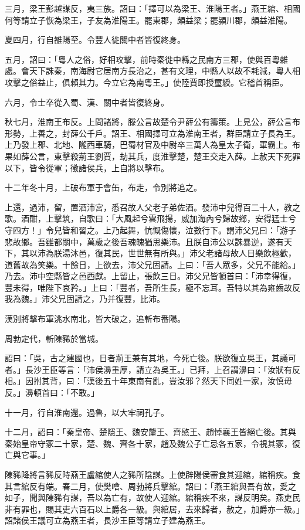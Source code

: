 \begin{pinyinscope}
三月，梁王彭越謀反，夷三族。詔曰：「擇可以為梁王、淮陽王者。」燕王綰、相國何等請立子恢為梁王，子友為淮陽王。罷東郡，頗益梁；罷潁川郡，頗益淮陽。

夏四月，行自雒陽至。令豐人徙關中者皆復終身。

五月，詔曰：「粵人之俗，好相攻擊，前時秦徙中縣之民南方三郡，使與百粵雜處。會天下誅秦，南海尉它居南方長治之，甚有文理，中縣人以故不耗減，粵人相攻擊之俗益止，俱賴其力。今立它為南粵王。」使陸賈即授璽綬。它稽首稱臣。

六月，令士卒從入蜀、漢、關中者皆復終身。

秋七月，淮南王布反。上問諸將，滕公言故楚令尹薛公有籌策。上見公，薛公言布形勢，上善之，封薛公千戶。詔王、相國擇可立為淮南王者，群臣請立子長為王。上乃發上郡、北地、隴西車騎，巴蜀材官及中尉卒三萬人為皇太子衛，軍霸上。布果如薛公言，東擊殺荊王劉賈，劫其兵，度淮擊楚，楚王交走入薛。上赦天下死罪以下，皆令從軍；徵諸侯兵，上自將以擊布。

十二年冬十月，上破布軍于會缶，布走，令別將追之。

上還，過沛，留，置酒沛宮，悉召故人父老子弟佐酒。發沛中兒得百二十人，教之歌。酒酣，上擊筑，自歌曰：「大風起兮雲飛揚，威加海內兮歸故鄉，安得猛士兮守四方！」令兒皆和習之。上乃起舞，忼慨傷懷，泣數行下。謂沛父兄曰：「游子悲故鄉。吾雖都關中，萬歲之後吾魂魄猶思樂沛。且朕自沛公以誅暴逆，遂有天下，其以沛為朕湯沐邑，復其民，世世無有所與。」沛父老諸母故人日樂飲極歡，道舊故為笑樂。十餘日，上欲去，沛父兄固請。上曰：「吾人眾多，父兄不能給。」乃去。沛中空縣皆之邑西獻。上留止，張飲三日。沛父兄皆頓首曰：「沛幸得復，豐未得，唯陛下哀矜。」上曰：「豐者，吾所生長，極不忘耳。吾特以其為雍齒故反我為魏。」沛父兄固請之，乃并復豐，比沛。

漢別將擊布軍洮水南北，皆大破之，追斬布番陽。

周勃定代，斬陳豨於當城。

詔曰：「吳，古之建國也，日者荊王兼有其地，今死亡後。朕欲復立吳王，其議可者。」長沙王臣等言：「沛侯濞重厚，請立為吳王。」已拜，上召謂濞曰：「汝狀有反相。」因拊其背，曰：「漢後五十年東南有亂，豈汝邪？然天下同姓一家，汝慎毋反。」濞頓首曰：「不敢。」

十一月，行自淮南還。過魯，以大牢祠孔子。

十二月，詔曰：「秦皇帝、楚隱王、魏安釐王、齊愍王、趙悼襄王皆絕亡後。其與秦始皇帝守冢二十家，楚、魏、齊各十家，趙及魏公子亡忌各五家，令視其冢，復亡與它事。」

陳豨降將言豨反時燕王盧綰使人之豨所陰謀。上使辟陽侯審食其迎綰，綰稱疾。食其言綰反有端。春二月，使樊噲、周勃將兵擊綰。詔曰：「燕王綰與吾有故，愛之如子，聞與陳豨有謀，吾以為亡有，故使人迎綰。綰稱疾不來，謀反明矣。燕吏民非有罪也，賜其吏六百石以上爵各一級。與綰居，去來歸者，赦之，加爵亦一級。」詔諸侯王議可立為燕王者，長沙王臣等請立子建為燕王。


\end{pinyinscope}
